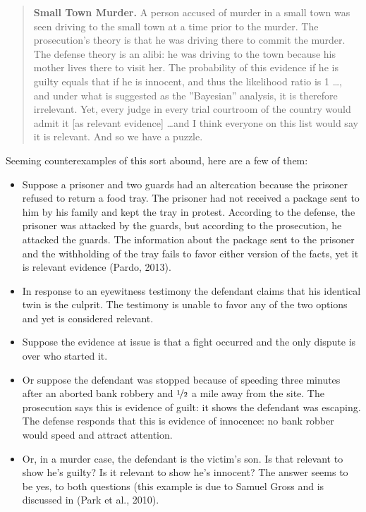 \documentclass[
  10pt,
  dvipsnames,enabledeprecatedfontcommands]{scrartcl}
\begin{document}
\begin{quote}
    \textbf{Small Town Murder.} A person accused of murder in a small town was seen driving to the small town at a time prior to the murder. The prosecution's theory is that he was driving there to commit the murder. The defense theory is an alibi: he was driving to the town because his mother lives there to visit her. The probability of this evidence if he is guilty equals that if he is innocent, and thus the likelihood ratio is 1 \dots , and under what is suggested as the ''Bayesian'' analysis, it is therefore irrelevant. 
    Yet, every judge in every trial courtroom of the country would admit it [as relevant evidence] \dots and I think everyone on this list would say it is relevant.  And so we have a puzzle.  
    \end{quote}

\noindent  Seeming counterexamples of this sort abound, here are a few
of them:

\begin{itemize}
\item
  Suppose a prisoner and two guards had an altercation because the
  prisoner refused to return a food tray. The prisoner had not received
  a package sent to him by his family and kept the tray in protest.
  According to the defense, the prisoner was attacked by the guards, but
  according to the prosecution, he attacked the guards. The information
  about the package sent to the prisoner and the withholding of the tray
  fails to favor either version of the facts, yet it is relevant
  evidence (Pardo, 2013).
\item
  In response to an eyewitness testimony the defendant claims that his
  identical twin is the culprit. The testimony is unable to favor any of
  the two options and yet is considered relevant.
\item
  Suppose the evidence at issue is that a fight occurred and the only
  dispute is over who started it.
\item
  Or suppose the defendant was stopped because of speeding three minutes
  after an aborted bank robbery and \(\nicefrac{1}{2}\) a mile away from
  the site. The prosecution says this is evidence of guilt: it shows the
  defendant was escaping. The defense responds that this is evidence of
  innocence: no bank robber would speed and attract attention.
\item
  Or, in a murder case, the defendant is the victim's son. Is that
  relevant to show he's guilty? Is it relevant to show he's innocent?
  The answer seems to be yes, to both questions (this example is due to
  Samuel Gross and is discussed in (Park et al., 2010).
\end{itemize}
\end{document}

